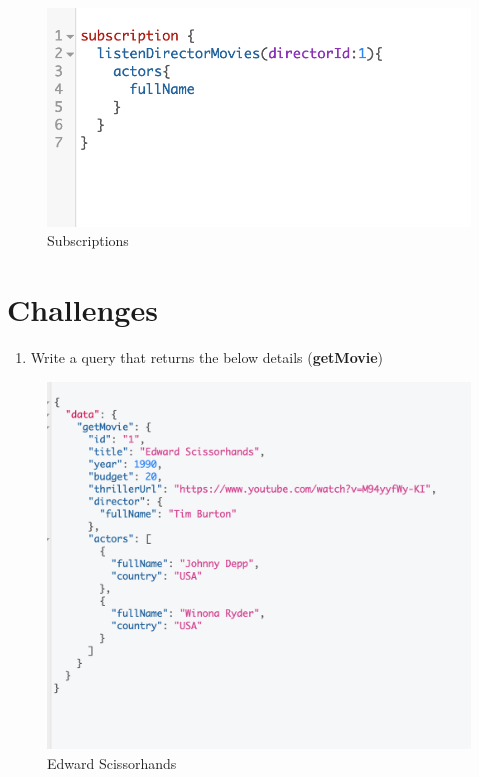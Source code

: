 \documentclass[]{book}
\providecommand{\tightlist}{%
  \setlength{\itemsep}{0pt}\setlength{\parskip}{0pt}}
\begin{document}
\begin{figure}
\centering
\includegraphics{assets/subscriptions.png}
\caption{Subscriptions}
\end{figure}

\section{Challenges}\label{challenges}

\begin{enumerate}
\def\labelenumi{\arabic{enumi}.}
\tightlist
\item
  Write a query that returns the below details (\textbf{getMovie})
\end{enumerate}

\begin{figure}
\centering
\includegraphics{assets/challenge-1.png}
\caption{Edward Scissorhands}
\end{figure}
\end{document}
